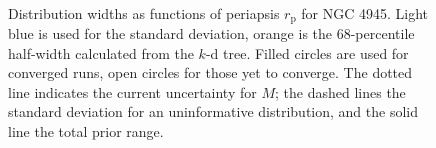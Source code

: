 \documentclass[useAMS,usedcolumn,usegraphicx,usenatbib]{mn2e}
\newcommand{\sub}[1]{\ensuremath{_\mathrm{#1}}}
\begin{document}
\begin{figure}
\begin{center}
 \quad
{} \\
\caption{Distribution widths as functions of periapsis $r\sub{p}$ for NGC 4945. Light blue is used for the standard deviation, orange is the $68$-percentile half-width calculated from the $k$-d tree. Filled circles are used for converged runs, open circles for those yet to converge. The dotted line indicates the current uncertainty for $M$; the dashed lines the standard deviation for an uninformative distribution, and the solid line the total prior range.\label{fig:sigmas-N4945}}
\end{center}
\end{figure}
\end{document}
